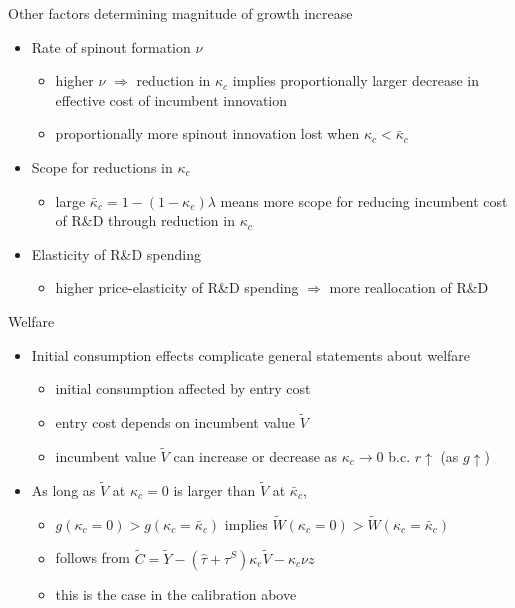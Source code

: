 \documentclass[english,usenames,dvipsnames]{beamer}
\begin{document}
\begin{frame}{Other factors determining magnitude of growth increase}
	\begin{itemize}
		\item <+-> Rate of spinout formation $\nu$
		\begin{itemize}
			\item higher $\nu$ $\Rightarrow$ reduction in $\kappa_c$ implies proportionally larger decrease in effective cost of incumbent innovation
			\item proportionally more spinout innovation lost when $\kappa_c < \bar{\kappa}_c$ 
		\end{itemize}
		\medskip
		\item <+-> Scope for reductions in $\kappa_c$
		\begin{itemize}
		\item large $\bar{\kappa}_c = 1 - (1-\kappa_e)\lambda $ means more scope for reducing incumbent cost of R\&D through reduction in $\kappa_c$
		\end{itemize}
		\medskip
		\item <+-> Elasticity of R\&D spending 
		\begin{itemize}
			\item higher price-elasticity of R\&D spending $\Rightarrow$ more reallocation of R\&D
		\end{itemize}
	\end{itemize}
\end{frame}

\begin{frame}{Welfare}
	\begin{itemize}
		\item Initial consumption effects complicate general statements about welfare
		\begin{itemize}
			\item initial consumption affected by entry cost
			\item entry cost depends on incumbent value $\tilde{V}$ 
			\item incumbent value $\tilde{V}$ can increase or decrease as $\kappa_c \to 0$ b.c. $r \uparrow$ (as $g \uparrow$)
		\end{itemize}
		\medskip
		\item As long as $\tilde{V}$ at $\kappa_c = 0$ is larger than $\tilde{V}$ at $\bar{\kappa}_c$,
		\begin{itemize}
			\item $g(\kappa_c = 0) > g(\kappa_c = \bar{\kappa}_c)$ implies $\tilde{W}(\kappa_c = 0) > \tilde{W}(\kappa_c = \bar{\kappa}_c)$
			\smallskip
			\item follows from $\tilde{C} = \tilde{Y} - (\hat{\tau} + \tau^S)\kappa_e \tilde{V} - \kappa_c \nu z$
			\item this is the case in the calibration above
		\end{itemize}
	\end{itemize}
\end{frame}
\end{document}
